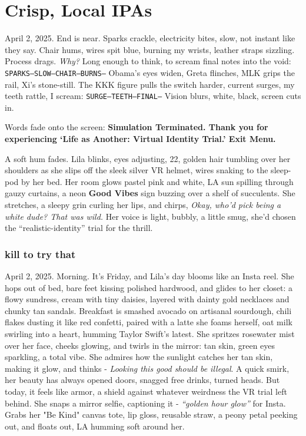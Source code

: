 \documentclass[12pt,oneside]{book} %
\newcommand{\note}[1]{\texttt{#1}}
\begin{document}
\chapter{Crisp, Local IPAs}

April 2, 2025. End is near. Sparks crackle, electricity bites, slow, not instant like they say. Chair hums, wires spit blue, burning my wrists, leather straps sizzling. Process drags. \textit{Why?} Long enough to think, to scream final notes into the void: \note{SPARKS—SLOW—CHAIR—BURNS—} Obama’s eyes widen, Greta flinches, MLK grips the rail, Xi’s stone-still. The KKK figure pulls the switch harder, current surges, my teeth rattle, I scream: \note{SURGE—TEETH—FINAL—} Vision blurs, white, black, screen cuts in.

Words fade onto the screen: \textbf{Simulation Terminated. Thank you for experiencing ‘Life as Another: Virtual Identity Trial.’ Exit Menu.}

A soft hum fades. Lila blinks, eyes adjusting, 22, golden hair tumbling over her shoulders as she slips off the sleek silver VR helmet, wires snaking to the sleep-pod by her bed. Her room glows pastel pink and white, LA sun spilling through gauzy curtains, a neon \textbf{Good Vibes} sign buzzing over a shelf of succulents. She stretches, a sleepy grin curling her lips, and chirps, \textit{Okay, who’d pick being a white dude? That was wild.} Her voice is light, bubbly, a little smug, she’d chosen the “realistic-identity” trial for the thrill.

\subsection*{kill to try that}

April 2, 2025. Morning. It’s Friday, and Lila’s day blooms like an Insta reel. She hops out of bed, bare feet kissing polished hardwood, and glides to her closet: a flowy sundress, cream with tiny daisies, layered with dainty gold necklaces and chunky tan sandals. Breakfast is smashed avocado on artisanal sourdough, chili flakes dusting it like red confetti, paired with a latte she foams herself, oat milk swirling into a heart, humming Taylor Swift’s latest. She spritzes rosewater mist over her face, cheeks glowing, and twirls in the mirror: tan skin, green eyes sparkling, a total vibe. She admires how the sunlight catches her tan skin, making it glow, and thinks - \textit{Looking this good should be illegal}. A quick smirk, her beauty has always opened doors, snagged free drinks, turned heads. But today, it feels like armor, a shield against whatever weirdness the VR trial left behind. She snaps a mirror selfie, captioning it - \textit{“golden hour glow”} for Insta. Grabs her "Be Kind" canvas tote, lip gloss, reusable straw, a peony petal peeking out, and floats out, LA humming soft around her.
\end{document}
